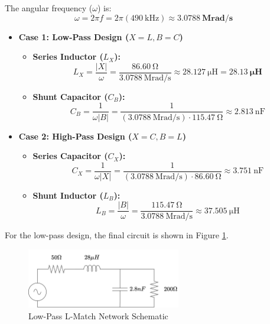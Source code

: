 The angular frequency ($\omega$) is:
\begin{equation}
    \omega = 2 \pi f = 2 \pi (\SI{490}{\kilo\hertz}) \approx \mathbf{\SI{3.0788}{\mega\radian\per\second}}
\end{equation}

\begin{itemize}
    \item \textbf{Case 1: Low-Pass Design ($X = L, B = C$)}
    \begin{itemize}
        \item \textbf{Series Inductor ($L_X$):} 
        \begin{equation}
            L_X = \frac{|X|}{\omega} = \frac{\SI{86.60}{\ohm}}{\SI{3.0788}{\mega\radian\per\second}} \approx \SI{28.127}{\micro\henry} = \mathbf{\SI{28.13}{\micro\henry}}
        \end{equation}
        \item \textbf{Shunt Capacitor ($C_B$):} 
        \begin{equation}
            C_B = \frac{1}{\omega |B|} = \frac{1}{(\SI{3.0788}{\mega\radian\per\second}) \cdot \SI{115.47}{\ohm}} \approx \SI{2.813}{\nano\farad}
        \end{equation}
    \end{itemize}

    \item \textbf{Case 2: High-Pass Design ($X = C, B = L$)}
    \begin{itemize}
        \item \textbf{Series Capacitor ($C_X$):} 
        \begin{equation}
            C_X = \frac{1}{\omega |X|} = \frac{1}{(\SI{3.0788}{\mega\radian\per\second}) \cdot \SI{86.60}{\ohm}} \approx \SI{3.751}{\nano\farad}
        \end{equation}
        \item \textbf{Shunt Inductor ($L_B$):} 
        \begin{equation}
            L_B = \frac{|B|}{\omega} = \frac{\SI{115.47}{\ohm}}{\SI{3.0788}{\mega\radian\per\second}} \approx \SI{37.505}{\micro\henry}
        \end{equation}
    \end{itemize}
\end{itemize}

For the low-pass design, the final circuit is shown in Figure \ref{fig:lmatch_lp}.

\begin{figure}[H]
    \centering
    \includegraphics[width=0.6\textwidth]{Images/LC-values.png}
    \caption{Low-Pass L-Match Network Schematic}
    \label{fig:lmatch_lp}
\end{figure}

